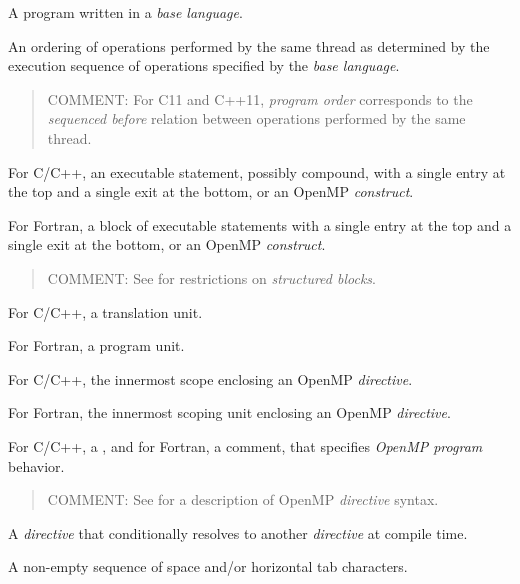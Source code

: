 \glossarydefstart
A program written in a \emph{base language}.
\glossarydefend

\glossarydefstart
An ordering of operations performed by the same thread as determined by the
execution sequence of operations specified by the \emph{base language}.

\begin{quote}
COMMENT: For C11 and C++11, \emph{program order} corresponds to the 
\emph{sequenced before} relation between operations performed by the 
same thread.
\end{quote}
\glossarydefend

\glossarydefstart
For C/C++, an executable statement, possibly compound, with a single 
entry at the top and a single exit at the bottom, or an OpenMP 
\emph{construct}.

For Fortran, a block of executable statements with a single entry at 
the top and a single exit at the bottom, or an OpenMP \emph{construct}.

\begin{quote}
COMMENT:
See  for restrictions on \emph{structured blocks}.
\end{quote}
\glossarydefend

\glossarydefstart
For C/C++, a translation unit.

For Fortran, a program unit.
\glossarydefend

\glossarydefstart
For C/C++, the innermost scope enclosing an OpenMP \emph{directive}.

For Fortran, the innermost scoping unit enclosing an OpenMP \emph{directive}.
\glossarydefend

\glossarydefstart
For C/C++, a , and for Fortran, a comment, that 
specifies \emph{OpenMP program} behavior.

\begin{quote}
COMMENT: See  for a description of OpenMP 
\emph{directive} syntax. 
\end{quote}
\glossarydefend

\glossarydefstart
A \emph{directive} that conditionally resolves to another \emph{directive} 
at compile time.
\glossarydefend


\glossarydefstart
A non-empty sequence of space and/or horizontal tab characters.
\glossarydefend

